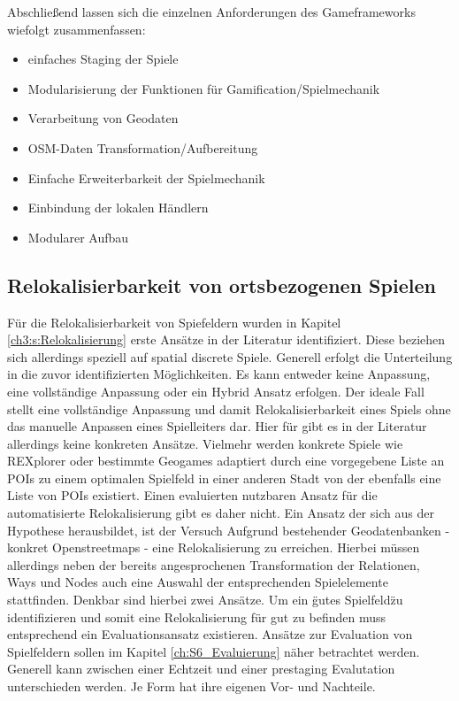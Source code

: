 Abschließend lassen sich die einzelnen Anforderungen des Gameframeworks wiefolgt zusammenfassen:

\begin{itemize}
\item einfaches Staging der Spiele
\item Modularisierung der Funktionen für Gamification/Spielmechanik
\item Verarbeitung von Geodaten
\item OSM-Daten Transformation/Aufbereitung
\item Einfache Erweiterbarkeit der Spielmechanik
\item Einbindung der lokalen Händlern
\item Modularer Aufbau
\end{itemize}


\subsection*{Relokalisierbarkeit von ortsbezogenen Spielen}

Für die Relokalisierbarkeit von Spiefeldern wurden in Kapitel \ref{ch3:s:Relokalisierung} erste Ansätze in der Literatur identifiziert. Diese beziehen sich allerdings speziell auf spatial discrete Spiele.
Generell erfolgt die Unterteilung in die zuvor identifizierten Möglichkeiten.
Es kann entweder keine Anpassung, eine vollständige Anpassung oder ein Hybrid Ansatz erfolgen. Der ideale Fall stellt eine vollständige Anpassung und damit Relokalisierbarkeit eines Spiels ohne das manuelle Anpassen eines Spielleiters dar. Hier für gibt es in der Literatur allerdings keine konkreten Ansätze. Vielmehr werden konkrete Spiele wie REXplorer \cite{Ballagas.2007} oder bestimmte Geogames \cite{Kiefer.2007} adaptiert durch eine vorgegebene Liste an POIs zu einem optimalen Spielfeld in einer anderen Stadt von der ebenfalls eine Liste von POIs existiert.
Einen evaluierten nutzbaren Ansatz für die automatisierte Relokalisierung gibt es daher nicht.
Ein Ansatz der sich aus der Hypothese herausbildet, ist der Versuch Aufgrund bestehender Geodatenbanken - konkret Openstreetmaps - eine Relokalisierung zu erreichen. Hierbei müssen allerdings neben der bereits angesprochenen Transformation der Relationen, Ways und Nodes auch eine Auswahl der entsprechenden Spielelemente stattfinden. Denkbar sind hierbei zwei Ansätze. Um ein \"gutes Spielfeld\" zu identifizieren und somit eine Relokalisierung für gut zu befinden muss entsprechend ein Evaluationsansatz existieren. Ansätze zur Evaluation von Spielfeldern sollen im Kapitel \ref{ch:S6_Evaluierung} näher betrachtet werden. Generell kann zwischen einer Echtzeit und einer prestaging Evalutation unterschieden werden. Je Form hat ihre eigenen Vor- und Nachteile.

